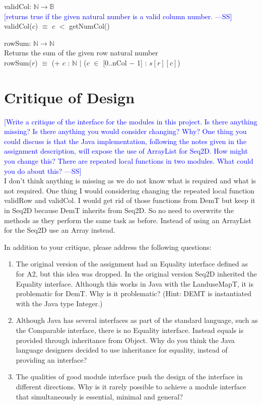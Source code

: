 \documentclass[12pt]{article}
\newcommand{\authornote}[3]{\textcolor{#1}{[#3 ---#2]}}
\newcommand{\authornote}[3]{}
\newcommand{\wss}[1]{\authornote{blue}{SS}{#1}}
\begin{document}
\noindent validCol: $\mathbb{N} \rightarrow \mathbb{B}$\\
\noindent \wss{returns true if the given natural number is a valid column
  number.}\\
  validCol($c$) $\equiv$ $c$ $<$ getNumCol()
  \medskip
  
\noindent rowSum: $\mathbb{N} \rightarrow \mathbb{N}$\\
\noindent Returns the sum of the given row natural number\\
  rowSum($r$) $\equiv$ (+ $c$ : $\mathbb{N}$ $|$ ($c$ $\in$ [0..nCol $-$ 1] : $s[r][c]$)


\newpage

\section*{Critique of Design}

\wss{Write a critique of the interface for the modules in this project.  Is there
anything missing?  Is there anything you would consider changing?  Why?  One
thing you could discuss is that the Java implementation, following the notes
given in the assignment description, will expose the use of ArrayList for Seq2D.
 How might you change this?  There are repeated local functions in two modules.
What could you do about this?}\\
I don't think anything is missing as we do not know what is required and what is not required. One thing I would considering changing the repeated local function validRow and validCol. I would get rid of those functions from DemT but keep it in Seq2D because DemT inherits from Seq2D. So no need to overwrite the methods as they perform the same task as before. Instead of using an ArrayList for the Seq2D use an Array instead.
\medskip

In addition to your critique, please address the following questions:

\begin{enumerate}
\item The original version of the assignment had an Equality interface defined
  as for A2, but this idea was dropped.  In the original version Seq2D inherited
  the Equality interface.  Although this works in Java with the LanduseMapT, it is
  problematic for DemT.  Why is it problematic?  (Hint: DEMT is instantiated
  with the Java type Integer.)
\item Although Java has several interfaces as part of the standard language,
  such as the Comparable interface, there is no Equality interface.  Instead
  equals is provided through inheritance from Object.  Why do you think the
  Java language designers decided to use inheritance for equality, instead of
  providing an interface?
\item The qualities of good module interface push the design of the interface in
  different directions. Why is it rarely possible to achieve a module interface
  that simultaneously is essential, minimal and general?
\end{enumerate}
\end{document}
